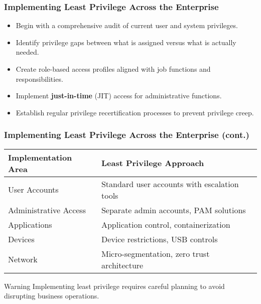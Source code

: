 \documentclass{beamer}
\begin{document}
    \begin{frame}
    \frametitle{Implementing Least Privilege Across the Enterprise}
    
    \begin{itemize}
    \item Begin with a comprehensive audit of current user and system privileges.
    \item Identify privilege gaps between what is assigned versus what is actually needed.
    \item Create role-based access profiles aligned with job functions and responsibilities.
    \item Implement \textbf{just-in-time} (JIT) access for administrative functions.
    \item Establish regular privilege recertification processes to prevent privilege creep.
    \end{itemize}
\end{frame}


    \begin{frame}
    \frametitle{Implementing Least Privilege Across the Enterprise (cont.)}
    \begin{table}
    \begin{tabularx}{\textwidth}{|l|X|}
    \hline
    \textbf{Implementation Area} & \textbf{Least Privilege Approach} \\
    \hline
    User Accounts & Standard user accounts with escalation tools \\
    \hline
    Administrative Access & Separate admin accounts, PAM solutions \\
    \hline
    Applications & Application control, containerization \\
    \hline
    Devices & Device restrictions, USB controls \\
    \hline
    Network & Micro-segmentation, zero trust architecture \\
    \hline
    \end{tabularx}
    \end{table}
    
    \begin{alertblock}{Warning}
    Implementing least privilege requires careful planning to avoid disrupting business operations.
    \end{alertblock}
    \end{frame}
    
\end{document}
